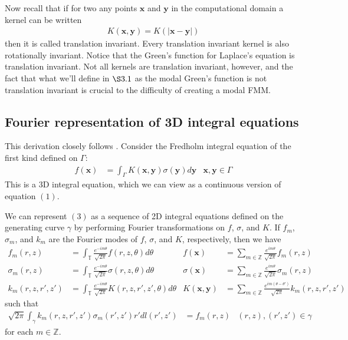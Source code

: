 \documentclass[11pt, oneside]{article}   	%
\begin{document}
Now recall that if for two any points $\mathbf{x}$ and $\mathbf{y}$ in the computational domain a kernel can be written
\begin{align*}
K(\mathbf{x},\mathbf{y}) = K(|\mathbf{x}-\mathbf{y}|)
\end{align*}
then it is called translation invariant. Every translation invariant kernel is also rotationally invariant. Notice that the Green's function for Laplace's equation is translation invariant. Not all kernels are translation invariant, however, and the fact that what we'll define in $\S3.1$ as the modal Green's function is not translation invariant is crucial to the difficulty of creating a modal FMM.

\subsection{Fourier representation of 3D integral equations}
This derivation closely follows \cite{YYM}. Consider the Fredholm integral equation of the first kind defined on $\Gamma$:
\begin{align}
f(\mathbf{x}) &= \int_\Gamma K(\mathbf{x},\mathbf{y})\sigma(\mathbf{y})d\mathbf{y} &\mathbf{x},\mathbf{y}\in\Gamma
\end{align}
This is a 3D integral equation, which we can view as a continuous version of equation $(1)$.

We can represent $(3)$ as a sequence of 2D integral equations defined on the generating curve $\gamma$ by performing Fourier transformations on $f$, $\sigma$, and $K$. If $f_m$, $\sigma_m$, and $k_m$ are the Fourier modes of $f$, $\sigma$, and $K$, respectively, then we have
\begin{align*}
f_m(r,z)&=\int_\mathbb{T}\frac{e^{-im\theta}}{\sqrt{2\pi}}f(r,z,\theta)d\theta&f(\mathbf{x})&=\sum_{m\in\mathbb{Z}}\frac{e^{im\theta}}{\sqrt{2\pi}}f_m(r,z)\\
\sigma_m(r,z)&=\int_\mathbb{T}\frac{e^{-im\theta}}{\sqrt{2\pi}}\sigma(r,z,\theta)d\theta&\sigma(\mathbf{x})&=\sum_{m\in\mathbb{Z}}\frac{e^{im\theta}}{\sqrt{2\pi}}\sigma_m(r,z)\\
k_m(r,z,r',z')&=\int_\mathbb{T}\frac{e^{-im\theta}}{\sqrt{2\pi}}K(r,z,r',z',\theta)d\theta&K(\mathbf{x},\mathbf{y})&=\sum_{m\in\mathbb{Z}}\frac{e^{im(\theta-\theta')}}{\sqrt{2\pi}}k_m(r,z,r',z')
\end{align*}
such that
\begin{align}
\sqrt{2\pi}\int_\gamma k_m(r,z,r',z')\sigma_m(r',z')r'dl(r',z')&=f_m(r,z) &(r,z),(r',z')\in\gamma
\end{align}
for each $m\in\mathbb{Z}$.
\end{document}
